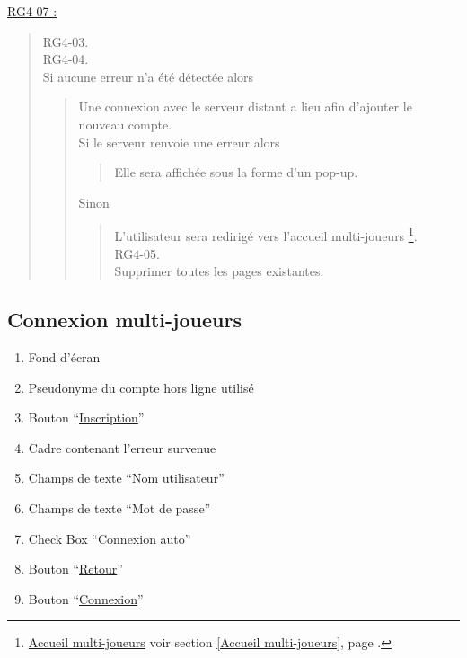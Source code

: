 \documentclass{report}
\begin{document}
			\underline{RG4-07 :}
				\begin{quote}
					RG4-03.\\
					RG4-04.\\
					Si aucune erreur n'a été détectée alors
						\begin{quote}
							Une connexion avec le serveur distant a lieu afin d'ajouter le nouveau compte.\\
							Si le serveur renvoie une erreur alors \\
							\begin{quote}
								Elle sera affichée sous la forme d'un pop-up.
							\end{quote}	
							Sinon
							\begin{quote}
								L'utilisateur sera redirigé vers l'accueil multi-joueurs%
								\footnote[2]{
									\hyperlink{Accueil multi-joueurs}{Accueil multi-joueurs}
									\og voir section \ref{Accueil multi-joueurs}, page \pageref{Accueil multi-joueurs}.\fg
								}.\\
								RG4-05.\\
								Supprimer toutes les pages existantes.					
							\end{quote}
						\end{quote}
				\end{quote}
	
\newpage

	\subsection{Connexion multi-joueurs}
	
		\hypertarget{Connexion multi-joueurs}{}
		\label{Connexion multi-joueurs}
	
		\begin{center}
					
		\end{center}
		
		\begin{enumerate}
		  \item Fond d'écran
		  \item Pseudonyme du compte hors ligne utilisé
		  \item Bouton ``\hyperlink{Creation compte multi-joueurs}{Inscription}''
		  \item Cadre contenant l'erreur survenue
		  \item Champs de texte ``Nom utilisateur''
		  \item Champs de texte ``Mot de passe''
		  \item Check Box ``Connexion auto''
		  \item Bouton ``\hyperlink{Page d'accueil}{Retour}''
		  \item Bouton ``\hyperlink{Accueil multi-joueurs}{Connexion}''
		\end{enumerate}
\end{document}
